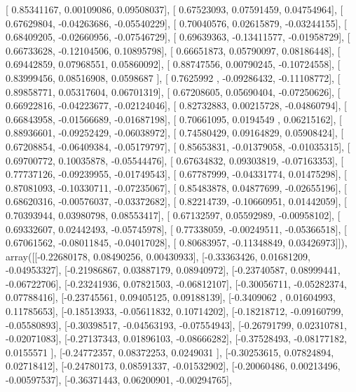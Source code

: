 \documentclass{article}
\begin{document}
       [ 0.85341167,  0.00109086,  0.09508037],
       [ 0.67523093,  0.07591459,  0.04754964],
       [ 0.67629804, -0.04263686, -0.05540229],
       [ 0.70040576,  0.02615879, -0.03244155],
       [ 0.68409205, -0.02660956, -0.07546729],
       [ 0.69639363, -0.13411577, -0.01958729],
       [ 0.66733628, -0.12104506,  0.10895798],
       [ 0.66651873,  0.05790097,  0.08186448],
       [ 0.69442859,  0.07968551,  0.05860092],
       [ 0.88747556,  0.00790245, -0.10724558],
       [ 0.83999456,  0.08516908,  0.0598687 ],
       [ 0.7625992 , -0.09286432, -0.11108772],
       [ 0.89858771,  0.05317604,  0.06701319],
       [ 0.67208605,  0.05690404, -0.07250626],
       [ 0.66922816, -0.04223677, -0.02124046],
       [ 0.82732883,  0.00215728, -0.04860794],
       [ 0.66843958, -0.01566689, -0.01687198],
       [ 0.70661095,  0.0194549 ,  0.06215162],
       [ 0.88936601, -0.09252429, -0.06038972],
       [ 0.74580429,  0.09164829,  0.05908424],
       [ 0.67208854, -0.06409384, -0.05179797],
       [ 0.85653831, -0.01379058, -0.01035315],
       [ 0.69700772,  0.10035878, -0.05544476],
       [ 0.67634832,  0.09303819, -0.07163353],
       [ 0.77737126, -0.09239955, -0.01749543],
       [ 0.67787999, -0.04331774,  0.01475298],
       [ 0.87081093, -0.10330711, -0.07235067],
       [ 0.85483878,  0.04877699, -0.02655196],
       [ 0.68620316, -0.00576037, -0.03372682],
       [ 0.82214739, -0.10660951,  0.01442059],
       [ 0.70393944,  0.03980798,  0.08553417],
       [ 0.67132597,  0.05592989, -0.00958102],
       [ 0.69332607,  0.02442493, -0.05745978],
       [ 0.77338059, -0.00249511, -0.05366518],
       [ 0.67061562, -0.08011845, -0.04017028],
       [ 0.80683957, -0.11348849,  0.03426973]]), array([[-0.22680178,  0.08490256,  0.00430933],
       [-0.33363426,  0.01681209, -0.04953327],
       [-0.21986867,  0.03887179,  0.08940972],
       [-0.23740587,  0.08999441, -0.06722706],
       [-0.23241936,  0.07821503, -0.06812107],
       [-0.30056711, -0.05282374,  0.07788416],
       [-0.23745561,  0.09405125,  0.09188139],
       [-0.3409062 ,  0.01604993,  0.11785653],
       [-0.18513933, -0.05611832,  0.10714202],
       [-0.18218712, -0.09160799, -0.05580893],
       [-0.30398517, -0.04563193, -0.07554943],
       [-0.26791799,  0.02310781, -0.02071083],
       [-0.27137343,  0.01896103, -0.08666282],
       [-0.37528493, -0.08177182,  0.0155571 ],
       [-0.24772357,  0.08372253,  0.0249031 ],
       [-0.30253615,  0.07824894,  0.02718412],
       [-0.24780173,  0.08591337, -0.01532902],
       [-0.20060486,  0.00213496, -0.00597537],
       [-0.36371443,  0.06200901, -0.00294765],
\end{document}
